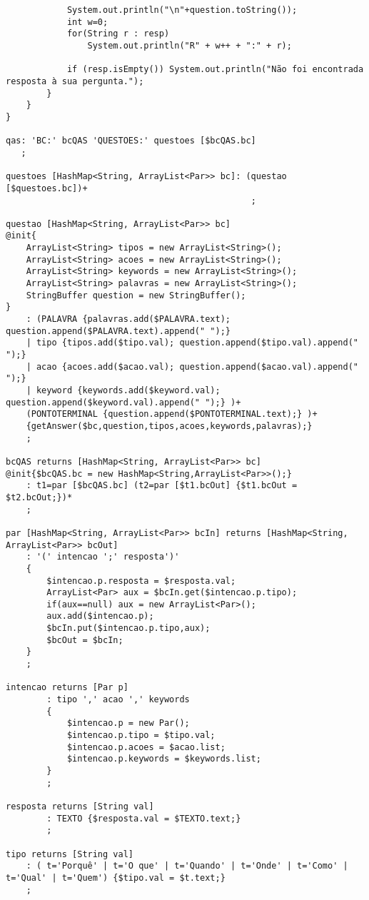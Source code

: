\begin{changemargin}{-3cm}{0cm}
\begin{verbatim}
            System.out.println("\n"+question.toString());
            int w=0;
            for(String r : resp)
                System.out.println("R" + w++ + ":" + r);

            if (resp.isEmpty()) System.out.println("Não foi encontrada resposta à sua pergunta.");
        }
    }
}

qas: 'BC:' bcQAS 'QUESTOES:' questoes [$bcQAS.bc]
   ;

questoes [HashMap<String, ArrayList<Par>> bc]: (questao [$questoes.bc])+
                                                ;

questao [HashMap<String, ArrayList<Par>> bc]
@init{
    ArrayList<String> tipos = new ArrayList<String>();
    ArrayList<String> acoes = new ArrayList<String>();
    ArrayList<String> keywords = new ArrayList<String>();
    ArrayList<String> palavras = new ArrayList<String>();
    StringBuffer question = new StringBuffer();
}
    : (PALAVRA {palavras.add($PALAVRA.text); question.append($PALAVRA.text).append(" ");} 
    | tipo {tipos.add($tipo.val); question.append($tipo.val).append(" ");} 
    | acao {acoes.add($acao.val); question.append($acao.val).append(" ");} 
    | keyword {keywords.add($keyword.val); question.append($keyword.val).append(" ");} )+ 
    (PONTOTERMINAL {question.append($PONTOTERMINAL.text);} )+
    {getAnswer($bc,question,tipos,acoes,keywords,palavras);}
    ;

bcQAS returns [HashMap<String, ArrayList<Par>> bc]
@init{$bcQAS.bc = new HashMap<String,ArrayList<Par>>();}
    : t1=par [$bcQAS.bc] (t2=par [$t1.bcOut] {$t1.bcOut = $t2.bcOut;})*
    ;

par [HashMap<String, ArrayList<Par>> bcIn] returns [HashMap<String, ArrayList<Par>> bcOut]
    : '(' intencao ';' resposta')' 
    {
        $intencao.p.resposta = $resposta.val;
        ArrayList<Par> aux = $bcIn.get($intencao.p.tipo);
        if(aux==null) aux = new ArrayList<Par>();
        aux.add($intencao.p);
        $bcIn.put($intencao.p.tipo,aux);
        $bcOut = $bcIn;
    }
    ;

intencao returns [Par p]
        : tipo ',' acao ',' keywords
        {
            $intencao.p = new Par();
            $intencao.p.tipo = $tipo.val;
            $intencao.p.acoes = $acao.list;
            $intencao.p.keywords = $keywords.list;
        }
        ;

resposta returns [String val]
        : TEXTO {$resposta.val = $TEXTO.text;}
        ;

tipo returns [String val]
    : ( t='Porquê' | t='O que' | t='Quando' | t='Onde' | t='Como' | t='Qual' | t='Quem') {$tipo.val = $t.text;}
    ;


\end{verbatim}
\end{changemargin}
